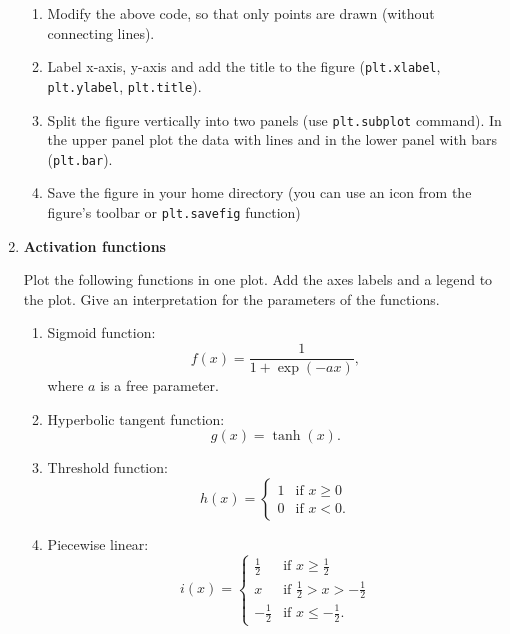 \documentclass[12pt, a4]{article}
\begin{document}
\begin{enumerate}
    \begin{enumerate}
        \item Modify the above code, so that only points are drawn (without connecting lines).
        \item Label x-axis, y-axis and add the title to the figure (\texttt{plt.xlabel}, \texttt{plt.ylabel}, \texttt{plt.title}).
        \item Split the figure vertically into two panels (use \texttt{plt.subplot} command). In the upper panel plot the data with lines and in the lower panel with bars (\texttt{plt.bar}).
        \item Save the figure in your home directory (you can use an icon from the figure's toolbar or \texttt{plt.savefig} function)
    \end{enumerate}

    \item \textbf{Activation functions}
    \label{ex:activation}

        Plot the following functions in one plot. Add the axes labels and a legend to the plot. Give an interpretation for the parameters of the functions.
    
        \begin{enumerate}
            \item Sigmoid function:
                $$f(x)=\frac{1}{1+\exp(-ax)},$$ 
                where $a$ is a free parameter.
            \item Hyperbolic tangent function:
                $$g(x)=\tanh(x).$$
            \item Threshold function:
                \begin{equation*}
                    h(x)=\begin{cases}1 & \text{if $x\geq0$} \\
                                    0 & \text{if $x<0$.}
                        \end{cases}
                \end{equation*}
            \item Piecewise linear:
                \begin{equation*}
                    i(x)=\begin{cases} \frac{1}{2}& \text{if $x\geq\frac{1}{2}$} \\
                        x & \text{if $\frac{1}{2}>x>-\frac{1}{2}$} \\
                        -\frac{1}{2} & \text{if $x\leq-\frac{1}{2}$.}
                        \end{cases}
                \end{equation*}
    

\end{enumerate}
\end{enumerate}
\end{document}
